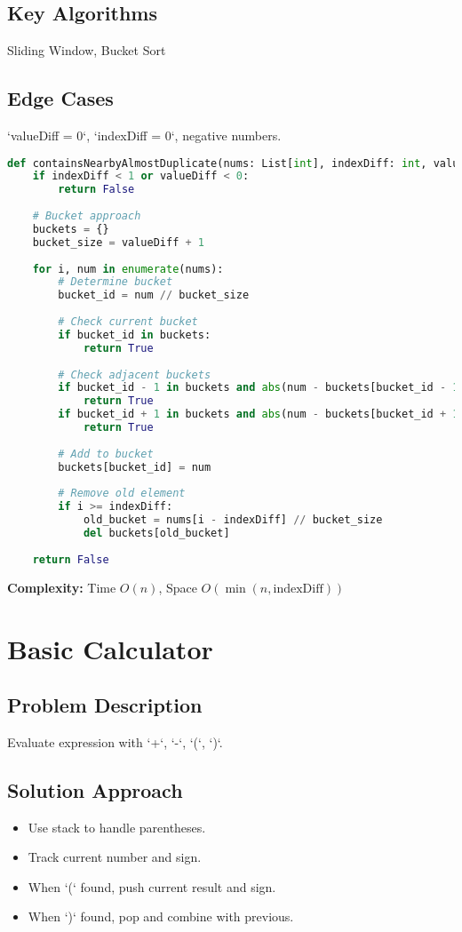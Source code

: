 \documentclass[10pt, a4paper]{article}
\begin{document}
\subsection*{Key Algorithms}
Sliding Window, Bucket Sort

\subsection*{Edge Cases}
`valueDiff = 0`, `indexDiff = 0`, negative numbers.

\begin{lstlisting}[language=Python]
def containsNearbyAlmostDuplicate(nums: List[int], indexDiff: int, valueDiff: int) -> bool:
    if indexDiff < 1 or valueDiff < 0:
        return False
    
    # Bucket approach
    buckets = {}
    bucket_size = valueDiff + 1
    
    for i, num in enumerate(nums):
        # Determine bucket
        bucket_id = num // bucket_size
        
        # Check current bucket
        if bucket_id in buckets:
            return True
        
        # Check adjacent buckets
        if bucket_id - 1 in buckets and abs(num - buckets[bucket_id - 1]) <= valueDiff:
            return True
        if bucket_id + 1 in buckets and abs(num - buckets[bucket_id + 1]) <= valueDiff:
            return True
        
        # Add to bucket
        buckets[bucket_id] = num
        
        # Remove old element
        if i >= indexDiff:
            old_bucket = nums[i - indexDiff] // bucket_size
            del buckets[old_bucket]
    
    return False
\end{lstlisting}
\textbf{Complexity:} Time $O(n)$, Space $O(\min(n, \text{indexDiff}))$

\section{Basic Calculator}
\subsection*{Problem Description}
Evaluate expression with `+`, `-`, `(`, `)`.

\subsection*{Solution Approach}
\begin{itemize}
    \item Use stack to handle parentheses.
    \item Track current number and sign.
    \item When `(` found, push current result and sign.
    \item When `)` found, pop and combine with previous.
\end{itemize}
\end{document}
